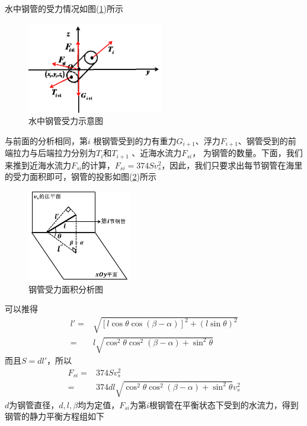 \documentclass[UTF8]{ctexbook}
\theoremstyle{nonumberplain}
\begin{document}
            水中钢管的受力情况如图(\ref{水中钢管受力示意图})所示
            \begin{figure}[H]
            \centering
            \includegraphics[height=4cm]{images/water_pipe_force.jpg}
            \caption{水中钢管受力示意图}
            \label{水中钢管受力示意图}
            \end{figure}
            \par
            与前面的分析相同，第$i$ 根钢管受到的力有重力$G_{i+1}$、浮力$F_{i+1}$、钢管受到的前端拉力与后端拉力分别为$T_i$和$T_{i+1}$ 、近海水流力$F_{si}$， 为钢管的数量。下面，我们来推到近海水流力$F_{si}$的计算，$F_{si} = 374Sv_s^2$，因此，我们只要求出每节钢管在海里的受力面积即可，钢管的投影如图(\ref{钢管受力面积分析图})所示
            \begin{figure}[H]
            \centering
            \includegraphics[height=4cm]{images/Steel_pipe_force_area.jpg}
            \caption{钢管受力面积分析图}
            \label{钢管受力面积分析图}
            \end{figure}
            可以推得
            \begin{align*}
            l' =&  \sqrt{[l\cos\theta\cos(\beta-\alpha)]^2+(l\sin\theta)^2}\\
            =& l\sqrt{\cos^2\theta\cos^2(\beta-\alpha)+\sin^2\theta}
            \end{align*}
            而且$S = dl'$，所以
            \begin{align*}
            F_{si} =&  374S v_s^2\\
            =& 374dl\sqrt{\cos^2\theta\cos^2(\beta-\alpha)+\sin^2\theta}v_s^2
            \end{align*}
            $d$为钢管直径，$d,l,\beta$均为定值，$F_{si}$为第$i$根钢管在平衡状态下受到的水流力，得到钢管的静力平衡方程组如下
\end{document}

